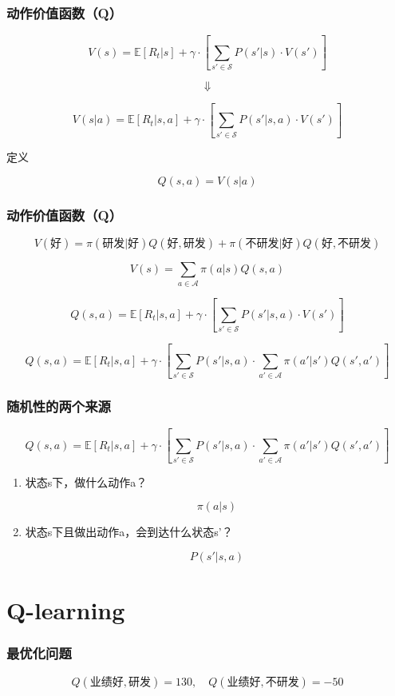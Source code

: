 \documentclass[8pt]{beamer}
\begin{document}
\begin{frame}
\frametitle{动作价值函数（Q）}

\[
V(s)=\mathbb{E}[R_t|s]+\gamma\cdot \left[\sum_{s'\in \mathcal{S}}P(s'|s)\cdot V(s')\right]
\]

\[
\Downarrow
\]

\[
V(s|a)=\mathbb{E}[R_t|s,a]+\gamma\cdot \left[\sum_{s'\in \mathcal{S}}P(s'|s,a)\cdot V(s')\right]
\]

\pause

定义

\[
Q(s,a)=V(s|a)
\]

\end{frame}

\begin{frame}
\frametitle{动作价值函数（Q）}

\[
V(\text{好})=\pi(\text{研发}|\text{好})Q(\text{好}, \text{研发})+\pi(\text{不研发}|\text{好})Q(\text{好},\text{不研发})
\]

\pause

\[
V(s)=\sum_{a\in \mathcal{A}}\pi(a|s)Q(s,a)
\]

\pause

\[
Q(s,a)=\mathbb{E}[R_t|s,a]+\gamma\cdot \left[\sum_{s'\in \mathcal{S}}P(s'|s,a)\cdot V(s')\right]
\]

\pause

\[
Q(s,a)=\mathbb{E}[R_t|s,a]+\gamma\cdot \left[\sum_{s'\in \mathcal{S}}P(s'|s,a)\cdot \sum_{a'\in \mathcal{A}}\pi(a'|s')Q(s',a')\right]
\]

\end{frame}

\begin{frame}
\frametitle{随机性的两个来源}

\[
Q(s,a)=\mathbb{E}[R_t|s,a]+\gamma\cdot \left[\sum_{s'\in \mathcal{S}}P(s'|s,a)\cdot \sum_{a'\in \mathcal{A}}\pi(a'|s')Q(s',a')\right]
\]

\vspace{1em}

\begin{enumerate}
\item 状态s下，做什么动作a？

\[
\pi(a|s)
\]

\item 状态s下且做出动作a，会到达什么状态s'？

\[
P(s'|s,a)
\]
\end{enumerate}


\end{frame}

\section{Q-learning}
\begin{frame}
\frametitle{最优化问题}

\[
Q(\text{业绩好},\text{研发})=130, \quad Q(\text{业绩好},\text{不研发})=-50
\]





\end{frame}
\end{document}
